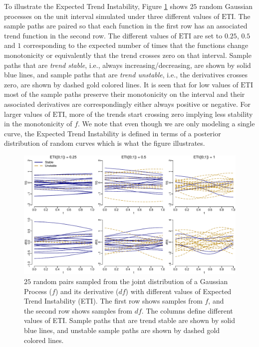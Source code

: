 \documentclass[11pt,]{article}
\theoremstyle{nonumberplain}
\begin{document}
To illustrate the Expected Trend Instability, Figure
\ref{fig:ETIexample} shows \(25\) random Gaussian processes on the unit
interval simulated under three different values of \(\mathrm{ETI}\). The
sample paths are paired so that each function in the first row has an
associated trend function in the second row. The different values of
\(\mathrm{ETI}\) are set to \(0.25\), \(0.5\) and \(1\) corresponding to
the expected number of times that the functions change monotonicity or
equivalently that the trend crosses zero on that interval. Sample paths
that are \textit{trend stable}, i.e., always increasing/decreasing, are
shown by solid blue lines, and sample paths that are
\textit{trend unstable}, i.e., the derivatives crosses zero, are shown
by dashed gold colored lines. It is seen that for low values of
\(\mathrm{ETI}\) most of the sample paths preserve their monotonicity on
the interval and their associated derivatives are correspondingly either
always positive or negative. For larger values of \(\mathrm{ETI}\), more
of the trends start crossing zero implying less stability in the
monotonicity of \(f\). We note that even though we are only modeling a
single curve, the Expected Trend Instability is defined in terms of a
posterior distribution of random curves which is what the figure
illustrates.

\begin{figure}[htb]
\center\includegraphics{../figures/ETIexample}
\caption{$25$ random pairs sampled from the joint distribution of a Gaussian Process ($f$) and its derivative ($df$) with different values of Expected Trend Instability (ETI). The first row shows samples from $f$, and the second row shows samples from $df$. The columns define different values of ETI. Sample paths that are trend stable are shown by solid blue lines, and unstable sample paths are shown by dashed gold colored lines.}
\label{fig:ETIexample}
\end{figure}
\end{document}
